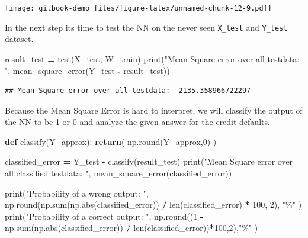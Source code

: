 \documentclass[
]{book}
\newenvironment{Shaded}{\begin{snugshade}}{\end{snugshade}}
\newcommand{\BuiltInTok}[1]{#1}
\newcommand{\ControlFlowTok}[1]{\textcolor[rgb]{0.13,0.29,0.53}{\textbf{#1}}}
\newcommand{\DecValTok}[1]{\textcolor[rgb]{0.00,0.00,0.81}{#1}}
\newcommand{\KeywordTok}[1]{\textcolor[rgb]{0.13,0.29,0.53}{\textbf{#1}}}
\newcommand{\NormalTok}[1]{#1}
\newcommand{\OperatorTok}[1]{\textcolor[rgb]{0.81,0.36,0.00}{\textbf{#1}}}
\newcommand{\StringTok}[1]{\textcolor[rgb]{0.31,0.60,0.02}{#1}}
\begin{document}
\texttt{[image: gitbook-demo\_files/figure-latex/unnamed-chunk-12-9.pdf]}

In the next step its time to test the NN on the never seen \texttt{X\_test} and \texttt{Y\_test} dataset.

\begin{Shaded}
\begin{Highlighting}[]
\NormalTok{result\_test }\OperatorTok{=}\NormalTok{ test(X\_test, W\_train)}
\BuiltInTok{print}\NormalTok{(}\StringTok{"Mean Square error over all testdata: "}\NormalTok{, mean\_square\_error(Y\_test }\OperatorTok{{-}}\NormalTok{ result\_test))}
\end{Highlighting}
\end{Shaded}

\begin{verbatim}
## Mean Square error over all testdata:  2135.358966722297
\end{verbatim}

Because the Mean Square Error is hard to interpret, we will classify the output of the NN to be 1 or 0 and analyze the given answer for the credit defaults.

\begin{Shaded}
\begin{Highlighting}[]
\KeywordTok{def}\NormalTok{ classify(Y\_approx):}
  \ControlFlowTok{return}\NormalTok{( np.}\BuiltInTok{round}\NormalTok{(Y\_approx,}\DecValTok{0}\NormalTok{) )}

\NormalTok{classified\_error }\OperatorTok{=}\NormalTok{ Y\_test }\OperatorTok{{-}}\NormalTok{ classify(result\_test)}
\BuiltInTok{print}\NormalTok{(}\StringTok{"Mean Square error over all classified testdata: "}\NormalTok{, mean\_square\_error(classified\_error))}

\BuiltInTok{print}\NormalTok{(}\StringTok{"Probability of a wrong output: "}\NormalTok{, np.}\BuiltInTok{round}\NormalTok{(np.}\BuiltInTok{sum}\NormalTok{(np.}\BuiltInTok{abs}\NormalTok{(classified\_error)) }\OperatorTok{/} \BuiltInTok{len}\NormalTok{(classified\_error) }\OperatorTok{*} \DecValTok{100}\NormalTok{, }\DecValTok{2}\NormalTok{), }\StringTok{"\%"}\NormalTok{ )}
\BuiltInTok{print}\NormalTok{(}\StringTok{"Probability of a correct output: "}\NormalTok{, np.}\BuiltInTok{round}\NormalTok{((}\DecValTok{1} \OperatorTok{{-}}\NormalTok{ np.}\BuiltInTok{sum}\NormalTok{(np.}\BuiltInTok{abs}\NormalTok{(classified\_error)) }\OperatorTok{/} \BuiltInTok{len}\NormalTok{(classified\_error))}\OperatorTok{*}\DecValTok{100}\NormalTok{,}\DecValTok{2}\NormalTok{),}\StringTok{"\%"}\NormalTok{ )}
\end{Highlighting}
\end{Shaded}
\end{document}
